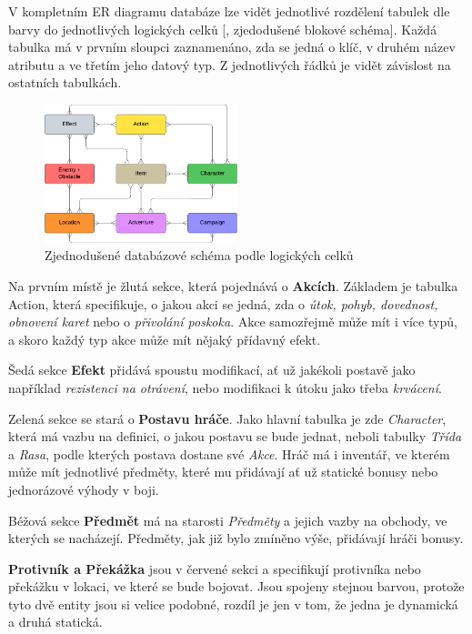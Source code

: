V kompletním ER diagramu databáze  lze vidět jednotlivé rozdělení tabulek dle barvy do jednotlivých logických celků [, zjedodušené blokové schéma]. Každá tabulka má v prvním sloupci zaznamenáno, zda se jedná o klíč, v druhém název atributu a ve třetím jeho datový typ. Z jednotlivých řádků je vidět závislost na ostatních tabulkách.

\begin{figure}[h]
    \centering
    \includegraphics[width=0.5\textwidth]{../../shared/diagrams/er_macro.pdf}
    \caption{Zjednodušené databázové schéma podle logických celků}
    \label{fig:database_schema:block}
\end{figure}

Na prvním místě je žlutá sekce, která pojednává o \textbf{Akcích}. Základem je tabulka Action, která specifikuje, o jakou akci se jedná, zda o \textit{útok, pohyb, dovednost, obnovení karet} nebo o \textit{přivolání poskoka}. Akce samozřejmě může mít i více typů, a skoro každý typ akce může mít nějaký přídavný efekt.

Šedá sekce \textbf{Efekt} přidává spoustu modifikací, ať už jakékoli postavě jako například \textit{rezistenci na otrávení}, nebo modifikaci k útoku jako třeba \textit{krvácení}.

Zelená sekce se stará o \textbf{Postavu hráče}. Jako hlavní tabulka je zde \textit{Character}, která má vazbu na definici, o jakou postavu se bude jednat, neboli tabulky \textit{Třída} a \textit{Rasa}, podle kterých postava dostane své \textit{Akce}. Hráč má i inventář, ve kterém může mít jednotlivé předměty, které mu přidávají ať už statické bonusy nebo jednorázové výhody v boji.

Béžová sekce \textbf{Předmět} má na starosti \textit{Předměty} a jejich vazby na obchody, ve kterých se nacházejí. Předměty, jak již bylo zmíněno výše, přidávají hráči bonusy.

\textbf{Protivník a Překážka} jsou v červené sekci a specifikují protivníka nebo překážku v lokaci, ve které se bude bojovat. Jsou spojeny stejnou barvou, protože tyto dvě entity jsou si velice podobné, rozdíl je jen v tom, že jedna je dynamická a druhá statická.

